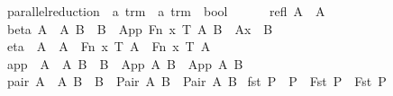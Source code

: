 \begin{implementation}
\isamarkupfalse%
\ parallel{\isacharunderscore}reduction\ {\isacharcolon}{\isacharcolon}\ {\isachardoublequoteopen}{\isacharprime}a\ trm\ {\isasymRightarrow}\ {\isacharprime}a\ trm\ {\isasymRightarrow}\ bool{\isachardoublequoteclose}\ {\isacharparenleft}{\isachardoublequoteopen}{\isacharunderscore}\ {\isachargreater}{\isachargreater}\ {\isacharunderscore}{\isachardoublequoteclose}{\isacharparenright}\ \isanewline
\ \ refl{\isacharcolon}\ {\isachardoublequoteopen}A\ {\isachargreater}{\isachargreater}\ A{\isachardoublequoteclose}\isanewline
{\isacharbar}\ beta{\isacharcolon}\ {\isachardoublequoteopen}{\isasymlbrakk}A\ {\isachargreater}{\isachargreater}\ A{\isacharprime}{\isacharsemicolon}\ B\ {\isachargreater}{\isachargreater}\ B{\isacharprime}{\isasymrbrakk}\ {\isasymLongrightarrow}\ {\isacharparenleft}App\ {\isacharparenleft}Fn\ x\ T\ A{\isacharparenright}\ B{\isacharparenright}\ {\isachargreater}{\isachargreater}\ {\isacharparenleft}A{\isacharprime}{\isacharbrackleft}x\ {\isacharcolon}{\isacharcolon}{\isacharequal}\ B{\isacharprime}{\isacharbrackright}{\isacharparenright}{\isachardoublequoteclose}\isanewline
{\isacharbar}\ eta{\isacharcolon}\ \ {\isachardoublequoteopen}A\ {\isachargreater}{\isachargreater}\ A{\isacharprime}\ {\isasymLongrightarrow}\ {\isacharparenleft}Fn\ x\ T\ A{\isacharparenright}\ {\isachargreater}{\isachargreater}\ {\isacharparenleft}Fn\ x\ T\ A{\isacharprime}{\isacharparenright}{\isachardoublequoteclose}\isanewline
{\isacharbar}\ app{\isacharcolon}\ \ {\isachardoublequoteopen}{\isasymlbrakk}A\ {\isachargreater}{\isachargreater}\ A{\isacharprime}{\isacharsemicolon}\ B\ {\isachargreater}{\isachargreater}\ B{\isacharprime}{\isasymrbrakk}\ {\isasymLongrightarrow}\ {\isacharparenleft}App\ A\ B{\isacharparenright}\ {\isachargreater}{\isachargreater}\ {\isacharparenleft}App\ A{\isacharprime}\ B{\isacharprime}{\isacharparenright}{\isachardoublequoteclose}\isanewline
{\isacharbar}\ pair{\isacharcolon}\ {\isachardoublequoteopen}{\isasymlbrakk}A\ {\isachargreater}{\isachargreater}\ A{\isacharprime}{\isacharsemicolon}\ B\ {\isachargreater}{\isachargreater}\ B{\isacharprime}{\isasymrbrakk}\ {\isasymLongrightarrow}\ {\isacharparenleft}Pair\ A\ B{\isacharparenright}\ {\isachargreater}{\isachargreater}\ {\isacharparenleft}Pair\ A{\isacharprime}\ B{\isacharprime}{\isacharparenright}{\isachardoublequoteclose}\isanewline
{\isacharbar}\ fst{}{\isacharcolon}\ {\isachardoublequoteopen}P\ {\isachargreater}{\isachargreater}\ P{\isacharprime}\ {\isasymLongrightarrow}\ {\isacharparenleft}Fst\ P{\isacharparenright}\ {\isachargreater}{\isachargreater}\ {\isacharparenleft}Fst\ P{\isacharprime}{\isacharparenright}{\isachardoublequoteclose}\isanewline

\end{implementation}
